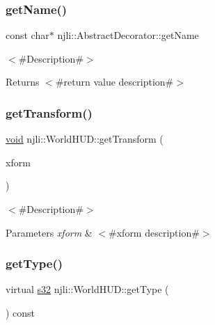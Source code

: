 \mbox{\label{classnjli_1_1_world_h_u_d_ad41266885be835f3ee602311e20877a4}} 
\subsubsection{\texorpdfstring{get\+Name()}{getName()}}
{\footnotesize\ttfamily const char$\ast$ njli\+::\+Abstract\+Decorator\+::get\+Name}

$<$\#\+Description\#$>$

\begin{DoxyReturn}{Returns}
$<$\#return value description\#$>$ 
\end{DoxyReturn}
\mbox{\label{classnjli_1_1_world_h_u_d_aaadec4b47522d9b7390d3e84ee8a5356}} 
\subsubsection{\texorpdfstring{get\+Transform()}{getTransform()}}
{\footnotesize\ttfamily \mbox{\hyperlink{_thread_8h_af1e856da2e658414cb2456cb6f7ebc66}{void}} njli\+::\+World\+H\+U\+D\+::get\+Transform (\begin{DoxyParamCaption}\item[{bt\+Matrix3x3 \&}]{xform }\end{DoxyParamCaption})}

$<$\#\+Description\#$>$


\begin{DoxyParams}{Parameters}
{\em xform} & $<$\#xform description\#$>$ \\
\hline
\end{DoxyParams}
\mbox{\label{classnjli_1_1_world_h_u_d_a2e73bd1fd7956213af66dd0bb4692761}} 
\subsubsection{\texorpdfstring{get\+Type()}{getType()}}
{\footnotesize\ttfamily virtual \mbox{\hyperlink{_util_8h_aa62c75d314a0d1f37f79c4b73b2292e2}{s32}} njli\+::\+World\+H\+U\+D\+::get\+Type (\begin{DoxyParamCaption}{ }\end{DoxyParamCaption}) const\hspace{0.3cm}{\ttfamily [virtual]}}

